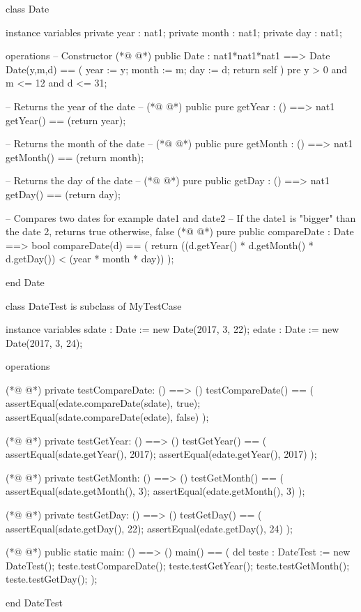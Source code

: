 \begin{vdmpp}[breaklines=true]
class Date

instance variables
 private year : nat1;
 private month : nat1;
 private day : nat1;

operations
 -- Constructor
(*@
\label{Date:10}
@*)
 public Date : nat1*nat1*nat1 ==> Date
  Date(y,m,d) == 
  (
   year := y;
   month := m;
   day := d;
   return self
  )
  pre y > 0 and m <= 12 and d <= 31;

 -- Returns the year of the date --
(*@
\label{getYear:21}
@*)
 public pure getYear : () ==> nat1
  getYear() == (return year); 
   
 -- Returns the month of the date --
(*@
\label{getMonth:25}
@*)
 public pure getMonth : () ==> nat1
  getMonth() == (return month); 
   
 -- Returns the day of the date --
(*@
\label{getDay:29}
@*)
 pure public getDay : () ==> nat1
  getDay() == (return day);
  
 -- Compares two dates for example date1 and date2
 -- If the date1 is "bigger" than the date 2, returns true otherwise, false 
(*@
\label{compareDate:34}
@*)
 pure public compareDate : Date ==> bool
  compareDate(d) == 
  (
   return ((d.getYear() * d.getMonth() * d.getDay()) < (year * month * day))
  );
  
end Date


class DateTest is subclass of MyTestCase

instance variables
 sdate : Date := new Date(2017, 3, 22);
 edate : Date := new Date(2017, 3, 24);
 
operations

(*@
\label{testCompareDate:51}
@*)
 private testCompareDate: () ==> ()
  testCompareDate() ==
  (
   assertEqual(edate.compareDate(sdate), true);
     assertEqual(sdate.compareDate(edate), false)
  );
  
(*@
\label{testGetYear:58}
@*)
 private testGetYear: () ==> ()
  testGetYear() ==
  (
   assertEqual(sdate.getYear(), 2017);
     assertEqual(edate.getYear(), 2017)
  );
  
(*@
\label{testGetMonth:65}
@*)
 private testGetMonth: () ==> ()
  testGetMonth() ==
  (
   assertEqual(sdate.getMonth(), 3);
     assertEqual(edate.getMonth(), 3)
  );
  
(*@
\label{testGetDay:72}
@*)
 private testGetDay: () ==> ()
  testGetDay() ==
  (
   assertEqual(sdate.getDay(), 22);
     assertEqual(edate.getDay(), 24)
  );
  
(*@
\label{main:79}
@*)
 public static main: () ==> ()
     main() ==
     (
      dcl teste : DateTest := new DateTest();
        teste.testCompareDate();
       teste.testGetYear();
       teste.testGetMonth();
       teste.testGetDay();
);

end DateTest
\end{vdmpp}
